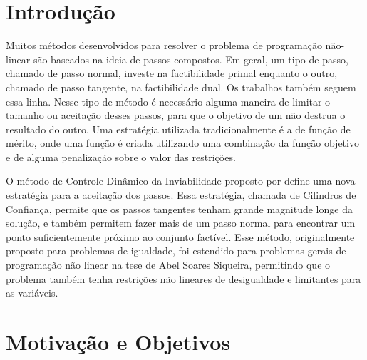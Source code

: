 \documentclass[letterpaper,12pt]{article}
\numberwithin{equation}{section}
\begin{document}

\newpage
{}

\newpage
\section{Introdução}

Muitos m\'{e}todos desenvolvidos para resolver o problema de programa\c{c}\~{a}o
n\~{a}o-linear s\~{a}o baseados na ideia de passos compostos. Em geral, um
tipo de passo, chamado de passo normal, investe na factibilidade primal 
enquanto o outro, chamado de passo tangente, na 
factibilidade dual. Os trabalhos \cite{bib:biegler,bib:byrd_gilbert,bib:byrd_hribar,bib:dennis,bib:el_alem,bib:gomes,bib:lalee} tamb\'{e}m seguem essa linha.
Nesse tipo de m\'{e}todo \'{e} necess\'{a}rio
alguma maneira de limitar o tamanho ou aceita\c{c}\~{a}o desses passos, 
para que o objetivo de um
n\~{a}o destrua o resultado do outro. Uma estrat\'{e}gia utilizada tradicionalmente
\'{e} a de fun\c{c}\~{a}o de m\'{e}rito, onde uma fun\c{c}\~{a}o \'{e} criada
utilizando uma combina\c{c}\~{a}o 
da fun\c{c}\~{a}o objetivo e de alguma
penaliza\c{c}\~{a}o sobre o valor das restri\c{c}\~{o}es. 

O método de Controle Dinâmico da Inviabilidade proposto por
\citet*{bib:chico} define uma nova estrat\'{e}gia para a aceita\c{c}\~{a}o
dos passos. Essa estrat\'{e}gia, chamada de Cilindros de Confian\c{c}a,
permite que os passos 
tangentes tenham grande magnitude longe da solução, 
e tamb\'{e}m permitem fazer mais de um passo
normal para encontrar um ponto suficientemente pr\'{o}ximo
ao conjunto fact\'{i}vel. Esse método, originalmente proposto para problemas 
de igualdade, foi estendido para problemas gerais de programação não linear
na tese de Abel Soares Siqueira, permitindo que o problema também tenha 
restrições não lineares de desigualdade e limitantes para as variáveis.

\section{Motivação e Objetivos}
\end{document}
